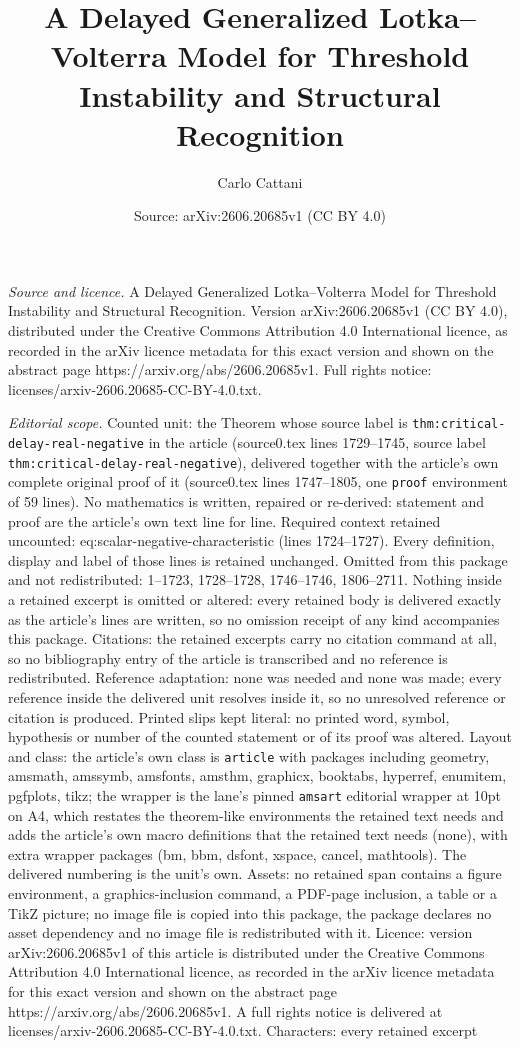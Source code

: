 \documentclass[10pt,a4paper]{amsart}
\title[A Delayed Generalized Lotka--Volterra Model for Threshold In]{A Delayed Generalized Lotka--Volterra Model for Threshold Instability and Structural Recognition}
\author{Carlo Cattani}
\date{Source: arXiv:2606.20685v1 (CC BY 4.0)}
\begin{document}
\maketitle

\noindent\emph{Source and licence.} A Delayed Generalized Lotka--Volterra Model for Threshold Instability and Structural Recognition. Version arXiv:2606.20685v1 (CC BY 4.0), distributed under the Creative Commons Attribution 4.0 International licence, as recorded in the arXiv licence metadata for this exact version and shown on the abstract page https://arxiv.org/abs/2606.20685v1. Full rights notice: licenses/arxiv-2606.20685-CC-BY-4.0.txt.\par\smallskip

\noindent\textit{Editorial scope.} Counted unit: the Theorem whose source label is \texttt{thm:critical-delay-real-negative} in the article (source0.tex lines 1729--1745, source label \texttt{thm:critical-delay-real-negative}), delivered together with the article's own complete original proof of it (source0.tex lines 1747--1805, one \texttt{proof} environment of 59 lines). No mathematics is written, repaired or re-derived: statement and proof are the article's own text line for line. Required context retained uncounted: eq:scalar-negative-characteristic (lines 1724--1727). Every definition, display and label of those lines is retained unchanged. Omitted from this package and not redistributed: 1--1723, 1728--1728, 1746--1746, 1806--2711. Nothing inside a retained excerpt is omitted or altered: every retained body is delivered exactly as the article's lines are written, so no omission receipt of any kind accompanies this package. Citations: the retained excerpts carry no citation command at all, so no bibliography entry of the article is transcribed and no reference is redistributed. Reference adaptation: none was needed and none was made; every reference inside the delivered unit resolves inside it, so no unresolved reference or citation is produced. Printed slips kept literal: no printed word, symbol, hypothesis or number of the counted statement or of its proof was altered. Layout and class: the article's own class is \texttt{article} with packages including geometry, amsmath, amssymb, amsfonts, amsthm, graphicx, booktabs, hyperref, enumitem, pgfplots, tikz; the wrapper is the lane's pinned \texttt{amsart} editorial wrapper at 10pt on A4, which restates the theorem-like environments the retained text needs and adds the article's own macro definitions that the retained text needs (none), with extra wrapper packages (bm, bbm, dsfont, xspace, cancel, mathtools). The delivered numbering is the unit's own. Assets: no retained span contains a figure environment, a graphics-inclusion command, a PDF-page inclusion, a table or a TikZ picture; no image file is copied into this package, the package declares no asset dependency and no image file is redistributed with it. Licence: version arXiv:2606.20685v1 of this article is distributed under the Creative Commons Attribution 4.0 International licence, as recorded in the arXiv licence metadata for this exact version and shown on the abstract page https://arxiv.org/abs/2606.20685v1. A full rights notice is delivered at licenses/arxiv-2606.20685-CC-BY-4.0.txt. Characters: every retained excerpt 
\end{document}

